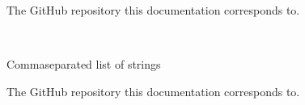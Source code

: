 \documentclass[letterpaper,10pt,english]{sphinxmanual}
\begin{document}
\vspace{5px}

\begin{fulllineitems}
\label{\detokenize{confval:confval-github_username}}~
\vspace{-45px}

\begin{DUlineblock}{0em}
\item[]  
\item[]  
\end{DUlineblock}

\end{fulllineitems}



\vspace{5px}

\begin{fulllineitems}
\label{\detokenize{confval:confval-github_repository}}~
\vspace{-45px}

\begin{DUlineblock}{0em}
\item[]  
\item[]  
\end{DUlineblock}

\vspace{-25px}

The GitHub repository this documentation corresponds to.

\end{fulllineitems}



\vspace{5px}

\begin{fulllineitems}
\label{\detokenize{confval:confval-conda_channels}}~
\vspace{-45px}

\begin{DUlineblock}{0em}
\item[]  Comma\sphinxhyphen{}separated list of strings
\item[]  
\end{DUlineblock}

\vspace{-25px}

The GitHub repository this documentation corresponds to.

\end{fulllineitems}
\end{document}
